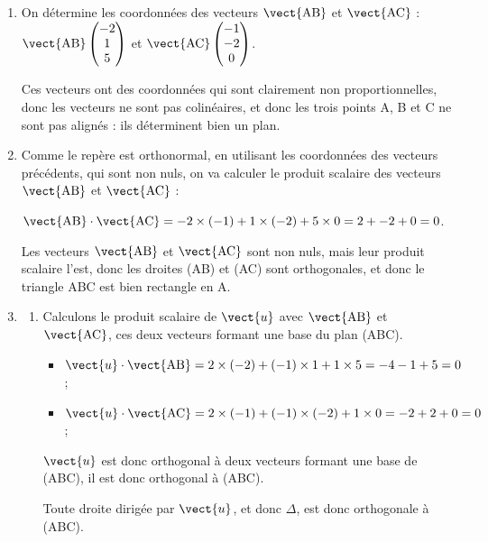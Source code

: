 \begin{enumerate}
	\item On détermine les coordonnées des vecteurs $\vect{\mathrm{AB}}$ et $\vect{\mathrm{AC}}$ : \quad $\vect{\mathrm{AB}}\begin{pmatrix}-2\\1\\5 \end{pmatrix}$
	 et $\vect{\mathrm{AC}}\begin{pmatrix}-1\\-2\\0 \end{pmatrix}$.

	 Ces vecteurs ont des coordonnées qui sont clairement non proportionnelles, donc les vecteurs ne sont pas colinéaires, et donc les trois points A, B et C ne sont pas alignés : ils déterminent bien un plan.

	 \item Comme le repère est orthonormal, en utilisant les coordonnées des vecteurs précédents, qui sont non nuls, on va calculer le produit scalaire des vecteurs $\vect{\mathrm{AB}}$ et $\vect{\mathrm{AC}}$ :

$\vect{\mathrm{AB}}\cdot\vect{\mathrm{AC}} = -2 \times (-1) + 1  \times  (-2) + 5  \times 0 = 2 + -2 + 0 = 0$.

Les vecteurs $\vect{\mathrm{AB}}$ et $\vect{\mathrm{AC}}$ sont non nuls, mais leur produit scalaire l'est, donc les droites (AB) et (AC) sont orthogonales, et donc le triangle ABC est bien rectangle en A.

	\item 
		\begin{enumerate}
		\item Calculons le produit scalaire de $\vect{u}$ avec $\vect{\mathrm{AB}}$ et $\vect{\mathrm{AC}}$, ces deux vecteurs formant une base du plan (ABC).

\begin{itemize}
\item $\vect{u}\cdot \vect{\mathrm{AB}} = 2  \times (-2) + (-1) \times 1 + 1  \times 5 = -4 - 1 + 5 = 0$;
\item $\vect{u}\cdot \vect{\mathrm{AC}} = 2  \times (-1) + (-1) \times (-2) + 1  \times 0 = -2 + 2 + 0 = 0$;
\end{itemize}

 $\vect{u}$ est donc orthogonal à deux vecteurs formant une base de (ABC), il est donc orthogonal à (ABC).

 		Toute droite dirigée par $\vect{u}$, et donc $\Delta$, est donc orthogonale à (ABC).


\end{enumerate}
\end{enumerate}
